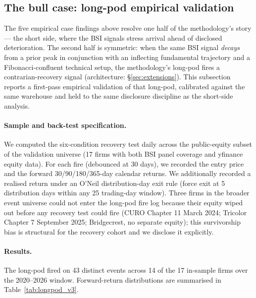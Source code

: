 \documentclass[11pt,a4paper]{article}
\begin{document}
\subsection{The bull case: long-pod empirical validation}\label{sec:results_longpod}

The five empirical case findings above resolve one half of the methodology's story --- the short side, where the BSI signals stress arrival ahead of disclosed deterioration. The second half is symmetric: when the same BSI signal \emph{decays} from a prior peak in conjunction with an inflecting fundamental trajectory and a Fibonacci-confluent technical setup, the methodology's long-pod fires a contrarian-recovery signal (architecture: §\ref{sec:extensions}). This subsection reports a first-pass empirical validation of that long-pod, calibrated against the same warehouse and held to the same disclosure discipline as the short-side analysis.

\paragraph{Sample and back-test specification.} We computed the six-condition recovery test daily across the public-equity subset of the validation universe (17 firms with both BSI panel coverage and yfinance equity data). For each fire (debounced at 30 days), we recorded the entry price and the forward 30/90/180/365-day calendar returns. We additionally recorded a realised return under an O'Neil distribution-day exit rule (force exit at 5 distribution days within any 25 trading-day window). Three firms in the broader event universe could not enter the long-pod fire log because their equity wiped out before any recovery test could fire (CURO Chapter 11 March 2024; Tricolor Chapter 7 September 2025; Bridgecrest, no separate equity); this survivorship bias is structural for the recovery cohort and we disclose it explicitly.

\paragraph{Results.} The long-pod fired on 43 distinct events across 14 of the 17 in-sample firms over the 2020--2026 window. Forward-return distributions are summarised in Table~\ref{tab:longpod_v3}.
\end{document}
